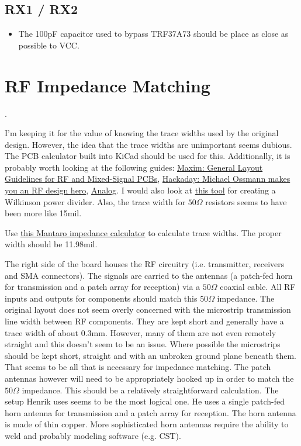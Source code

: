 \documentclass{default}
\begin{document}
\subsection{RX1 / RX2}

\begin{itemize}
\item The 100pF capacitor used to bypass TRF37A73 should be place as close as possible to VCC.
\end{itemize}

\section{RF Impedance Matching}

.

I'm keeping it for the value of knowing the trace widths used by the original design. However, the
idea that the trace widths are unimportant seems dubious. The PCB calculator built into KiCad should
be used for this. Additionally, it is probably worth looking at the following guides:
\href{https://www.maximintegrated.com/en/app-notes/index.mvp/id/5100#}{Maxim: General Layout
  Guidelines for RF and Mixed-Signal PCBs},
\href{https://hackaday.com/2016/03/23/michael-ossmann-makes-you-an-rf-design-hero/}{Hackaday:
  Michael Ossmann makes you an RF design hero},
\href{https://www.analog.com/media/en/training-seminars/design-handbooks/Basic-Linear-Design/Chapter12.pdf}{Analog}. I
would also look at \href{https://github.com/erichVK5/WilkinsonPowerDividerFootprintGenerator}{this
  tool} for creating a Wilkinson power divider. Also, the trace width for $50\si{\Omega}$ resistors
seems to have been more like 15mil.

Use \href{http://www.mantaro.com/resources/impedance-calculator.htm}{this Mantaro impedance
  calculator} to calculate trace widths. The proper width should be 11.98mil.

The right side of the board houses the RF circuitry (i.e. transmitter, receivers and SMA
connectors). The signals are carried to the antennas (a patch-fed horn for transmission and a patch
array for reception) via a $50\si{\Omega}$ coaxial cable. All RF inputs and outputs for components
should match this $50\si{\Omega}$ impedance. The original layout does not seem overly concerned with
the microstrip transmission line width between RF components. They are kept short and generally have
a trace width of about 0.3mm. However, many of them are not even remotely straight and this doesn't
seem to be an issue. Where possible the microstrips should be kept short, straight and with an
unbroken ground plane beneath them. That seems to be all that is necessary for impedance
matching. The patch antennas however will need to be appropriately hooked up in order to match the
$50\si{\Omega}$ impedance. This should be a relatively straightforward calculation. The setup Henrik
uses seems to be the most logical one. He uses a single patch-fed horn antenna for transmission and
a patch array for reception. The horn antenna is made of thin copper. More sophisticated horn
antennas require the ability to weld and probably modeling software (e.g. CST).
\end{document}
